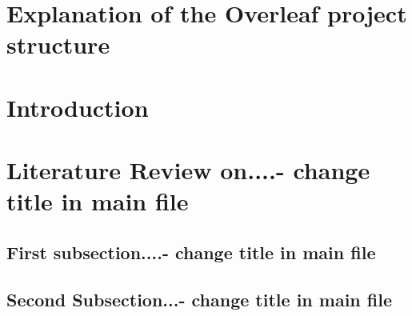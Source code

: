 \documentclass[12pt]{article}
\begin{document}


%
\begin{spacing}{1.5}
\newpage
{}
\setcounter{page}{1}
\tableofcontents

\newpage
\printglossary[type=\acronymtype, title= List of Abbreviations, toctitle=List of Abbreviations]

\newpage
\listoffigures
\listoftables




\newpage
{}
\setcounter{page}{1}
\section{Explanation of the Overleaf project structure}  %

\bigskip


\newpage
{}
\setcounter{page}{1}
\section{Introduction}  %

\bigskip


\newpage
\section{Literature Review on....- change title in main file} %

\subsection{First subsection....- change title in main file}

\subsection{Second Subsection...- change title in main file}


\newpage
\end{spacing}
\end{document}

